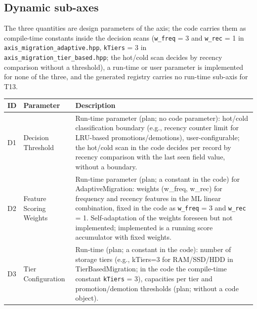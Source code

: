 \subsection*{Dynamic sub-axes}

The three quantities are design parameters of the axis; the code carries them as compile-time constants inside the decision scans (\texttt{w\_\allowbreak{}freq} = 3 and \texttt{w\_\allowbreak{}rec} = 1 in \texttt{axis\_\allowbreak{}migration\_\allowbreak{}adaptive.hpp}, \texttt{k\allowbreak{}Tiers} = 3 in \texttt{axis\_\allowbreak{}migration\_\allowbreak{}tier\_\allowbreak{}based.hpp}; the hot/\allowbreak{}cold scan decides by recency comparison without a threshold), a run-time or user parameter is implemented for none of the three, and the generated registry carries no run-time sub-axis for T13.

\begin{scriptsize}
\begin{longtable}{@{}>{\raggedright\arraybackslash}p{1.8cm} >{\raggedright\arraybackslash}p{3.2cm} >{\raggedright\arraybackslash}p{8.5cm}@{}}
\toprule
ID & Parameter & Description \\
\midrule
\endhead%
D1 & Decision Threshold & Run-time parameter (plan; no code parameter): hot/\allowbreak{}cold classification boundary (e.g., recency counter limit for LRU-based promotions/\allowbreak{}demotions), user-configurable; the hot/\allowbreak{}cold scan in the code decides per record by recency comparison with the last seen field value, without a boundary. \\
D2 & Feature Scoring Weights & Run-time parameter (plan; a constant in the code) for Adaptive\allowbreak{}Migration: weights (w\_\allowbreak{}freq, w\_\allowbreak{}rec) for frequency and recency features in the ML linear combination, fixed in the code as \texttt{w\_\allowbreak{}freq} = 3 and \texttt{w\_\allowbreak{}rec} = 1. Self-adaptation of the weights foreseen but not implemented; implemented is a running score accumulator with fixed weights. \\
D3 & Tier Configuration & Run-time (plan; a constant in the code): number of storage tiers (e.g., k\allowbreak{}Tiers=3 for RAM/\allowbreak{}SSD/\allowbreak{}HDD in Tier\allowbreak{}Based\allowbreak{}Migration; in the code the compile-time constant \texttt{k\allowbreak{}Tiers} = 3), capacities per tier and promotion/\allowbreak{}demotion thresholds (plan; without a code object). \\
\bottomrule
\end{longtable}
\end{scriptsize}

